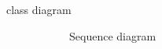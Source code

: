 \documentclass[11pt,a4paper]{article}
\begin{document}
\begin{description}
    \item[class diagram]    
     \begin{figure}[htb]
         \begin{center}
             \setlength\fboxsep{0pt}
             \caption{Sequence diagram}
             \label{fig:class_diag}
        \end{center}
\end{figure}

\end{description}
\end{document}
